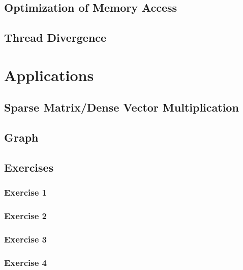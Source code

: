 \documentclass[12px,oz]{report}
\theoremstyle{indented}
\theoremstyle{indented}
\begin{document}
\section{Optimization of Memory Access}
\label{sec-opti-memory}


\section{Thread Divergence}
\label{sec-thread-div}


\chapter{Applications}
\label{ch-app}

	
	\section{Sparse Matrix/Dense Vector Multiplication}
	\label{sec-matrix}
	
	
	\section{Graph}
	\label{sec-graph}
	
	
	\section{Exercises}
		
	
		\subsection{Exercise 1}
		\subsection{Exercise 2}
		
		\subsection{Exercise 3}
		
		
		\subsection{Exercise 4}
		
		
\end{document}
